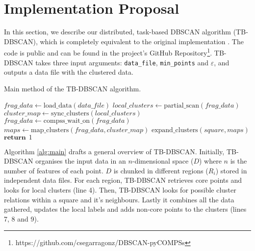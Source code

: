 \documentclass[10pt,journal,compsoc]{IEEEtran}
\let\MYoriglatexcaption\caption
\renewcommand{\caption}[2][\relax]{\MYoriglatexcaption[#2]{#2}}
\begin{document}


\section{Implementation Proposal} \label{sec:implementation}

In this section, we describe our distributed, task-based DBSCAN algorithm (TB-DBSCAN), which is completely equivalent to the original implementation \cite{ReferencePaper}. The code is public and can be found in the project's GitHub Repository\footnote{https://github.com/csegarragonz/DBSCAN-pyCOMPSs}. TB-DBSCAN takes three input arguments: \texttt{data\_file}, \texttt{min\_points} and \texttt{$\varepsilon$}, and outputs a data file with the clustered data.

\begin{algorithm}
  \caption{Main method of the TB-DBSCAN algorithm. \label{alg:main}}
  \begin{algorithmic}[1]
            \State $frag\_data \gets \text{load\_data}(data\_file)$
            \State $local\_clusters \gets \text{partial\_scan}(frag\_data)$
            \State $cluster\_map \gets \text{sync\_clusters}(local\_clusters)$
        \EndFor
        \State $frag\_data \gets \text{compss\_wait\_on}(frag\_data)$
        \State $ maps \gets \text{map\_clusters} (frag\_data, cluster\_map)$
            \State $\text{expand\_clusters} (square, maps)$
        \EndFor
        \State $\textbf{return} \hspace{5pt} 1$
    \EndFunction
  \end{algorithmic}
\end{algorithm}

Algorithm \ref{alg:main} drafts a general overview of TB-DBSCAN. Initially, TB-DBSCAN organises the input data in an $n$-dimensional space ($D$) where $n$ is the number of features of each point. $D$ is chunked in different regions ($R_i$) stored in independent data files. For each region, TB-DBSCAN retrieves core points and looks for local clusters (line 4). Then, TB-DBSCAN looks for possible cluster relations within a square and it's neighbours. Lastly it combines all the data gathered, updates the local labels and adds non-core points to the clusters (lines 7, 8 and 9).
\end{document}
